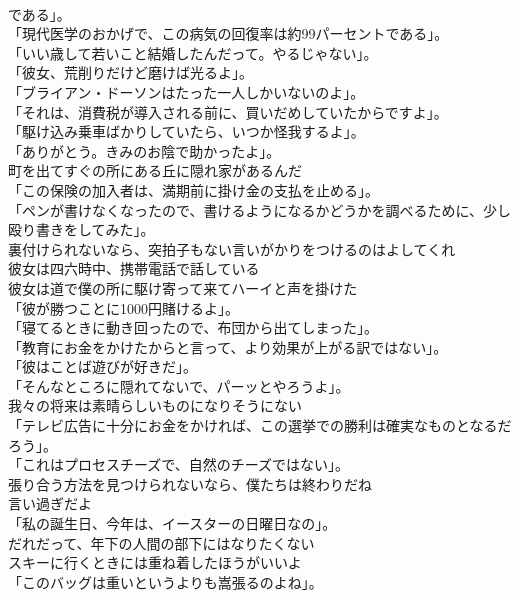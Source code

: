 \documentclass[8pt]{extreport}
\begin{document}
\begin{CJK}{UTF8}{min}
\\	である」。	
\\	「現代医学のおかげで、この病気の回復率は約99パーセントである」。	
\\	「いい歳して若いこと結婚したんだって。やるじゃない」。	
\\	「彼女、荒削りだけど磨けば光るよ」。	
\\	「ブライアン・ドーソンはたった一人しかいないのよ」。	
\\	「それは、消費税が導入される前に、買いだめしていたからですよ」。	
\\	「駆け込み乗車ばかりしていたら、いつか怪我するよ」。	
\\	「ありがとう。きみのお陰で助かったよ」。	
\\	町を出てすぐの所にある丘に隠れ家があるんだ	
\\	「この保険の加入者は、満期前に掛け金の支払を止める」。	
\\	「ペンが書けなくなったので、書けるようになるかどうかを調べるために、少し殴り書きをしてみた」。	
\\	裏付けられないなら、突拍子もない言いがかりをつけるのはよしてくれ	
\\	彼女は四六時中、携帯電話で話している	
\\	彼女は道で僕の所に駆け寄って来てハーイと声を掛けた	
\\	「彼が勝つことに1000円賭けるよ」。	
\\	「寝てるときに動き回ったので、布団から出てしまった」。	
\\	「教育にお金をかけたからと言って、より効果が上がる訳ではない」。	
\\	「彼はことば遊びが好きだ」。	
\\	「そんなところに隠れてないで、パーッとやろうよ」。	
\\	我々の将来は素晴らしいものになりそうにない	
\\	「テレビ広告に十分にお金をかければ、この選挙での勝利は確実なものとなるだろう」。	
\\	「これはプロセスチーズで、自然のチーズではない」。	
\\	張り合う方法を見つけられないなら、僕たちは終わりだね	
\\	言い過ぎだよ	
\\	「私の誕生日、今年は、イースターの日曜日なの」。	
\\	だれだって、年下の人間の部下にはなりたくない	
\\	スキーに行くときには重ね着したほうがいいよ	
\\	「このバッグは重いというよりも嵩張るのよね」。	

\end{CJK}
\end{document}
